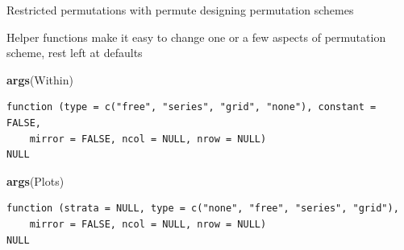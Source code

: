 \documentclass[10pt,ignorenonframetext,compress, aspectratio=169]{beamer}
\newenvironment{Shaded}{\begin{snugshade}}{\end{snugshade}}
\newcommand{\KeywordTok}[1]{\textcolor[rgb]{0.13,0.29,0.53}{\textbf{{#1}}}}
\newcommand{\NormalTok}[1]{{#1}}
\begin{document}
\begin{frame}[fragile]{Restricted permutations with permute \textbar{}
designing permutation schemes}

Helper functions make it easy to change one or a few aspects of
permutation scheme, rest left at defaults

\scriptsize

\begin{Shaded}
\begin{Highlighting}[]
\KeywordTok{args}\NormalTok{(Within)}
\end{Highlighting}
\end{Shaded}

\begin{verbatim}
function (type = c("free", "series", "grid", "none"), constant = FALSE, 
    mirror = FALSE, ncol = NULL, nrow = NULL) 
NULL
\end{verbatim}

\begin{Shaded}
\begin{Highlighting}[]
\KeywordTok{args}\NormalTok{(Plots)}
\end{Highlighting}
\end{Shaded}

\begin{verbatim}
function (strata = NULL, type = c("none", "free", "series", "grid"), 
    mirror = FALSE, ncol = NULL, nrow = NULL) 
NULL
\end{verbatim}

\normalsize

\end{frame}
\end{document}

